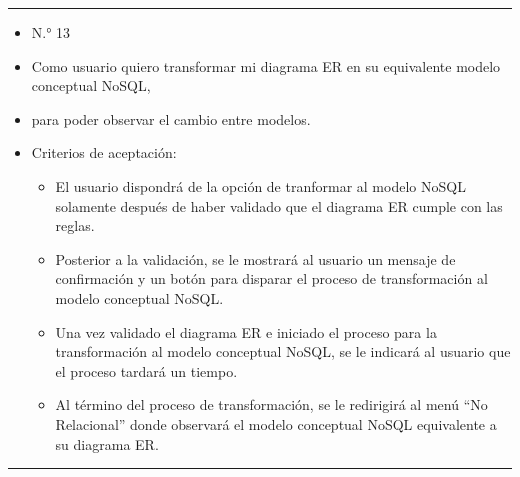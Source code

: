 \noindent\rule{\textwidth}{1pt}
\begin{itemize}
	\item N.° 13
	\item Como usuario quiero transformar mi diagrama ER en su equivalente modelo conceptual NoSQL,
	\item para poder observar el cambio entre modelos.
	\item Criterios de aceptación:
	\begin{itemize}
		\item El usuario dispondrá de la opción de tranformar al modelo NoSQL solamente después de haber validado que el diagrama ER cumple con las reglas.
		\item Posterior a la validación, se le mostrará al usuario un mensaje de confirmación y un botón para disparar el proceso de transformación al modelo conceptual NoSQL.
		\item Una vez validado el diagrama ER e iniciado el proceso para la transformación al modelo conceptual NoSQL, se le indicará al usuario que el proceso tardará un tiempo.
		\item Al término del proceso de transformación, se le redirigirá al menú ``No Relacional'' donde observará el modelo conceptual NoSQL equivalente a su diagrama ER.
	\end{itemize}
\end{itemize}
\noindent\rule{\textwidth}{1pt}
